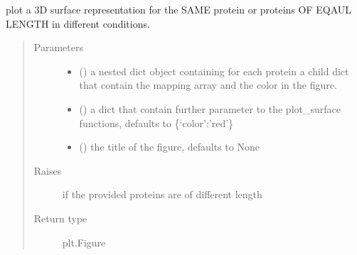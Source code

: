 \documentclass[letterpaper,10pt,english]{sphinxmanual}
\begin{document}
\begin{fulllineitems}
\label{\detokenize{IPTK.Visualization:IPTK.Visualization.vizTools.plot_protein_presentation_3D}}
plot a 3D surface representation for the SAME protein or proteins OF EQAUL LENGTH     in different conditions.
\begin{quote}\begin{description}
\item[{Parameters}] \leavevmode\begin{itemize}
\item {} 
 (\sphinxstyleliteralemphasis{\sphinxupquote{{[}}}\sphinxstyleliteralemphasis{\sphinxupquote{{]}}}) \textendash{} a nested dict object containing for each protein a child dict that contain     the mapping array and the color in the figure.

\item {} 
 (\sphinxstyleliteralemphasis{\sphinxupquote{, }}) \textendash{} a dict that contain further parameter to the plot\_surface functions, defaults to \{‘color’:’red’\}

\item {} 
 (\sphinxstyleliteralemphasis{\sphinxupquote{, }}) \textendash{} the title of the figure, defaults to None

\end{itemize}

\item[{Raises}] \leavevmode
{} \textendash{} if the provided proteins are of different length

\item[{Return type}] \leavevmode
plt.Figure

\end{description}\end{quote}

\end{fulllineitems}
\end{document}
